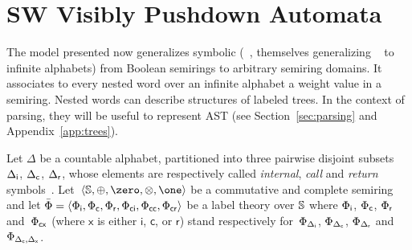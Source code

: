








\section{SW Visibly Pushdown Automata}
\label{section:SWVPA}\label{sec:SWVPA}
The model presented now generalizes symbolic \VPA
(\SVPA~\cite{dAntonyAlur14SVPDA},
 themselves generalizing \VPA~\cite{AlurMadhusudan09nested} to infinite alphabets)
from Boolean semirings to arbitrary semiring domains.
It associates to every nested word over an infinite alphabet a weight value
in a semiring.
Nested words can describe structures of labeled trees.
In the context of parsing, they will be useful to
represent AST %
(see Section~\ref{sec:parsing} and Appendix~\ref{app:trees}). %

\noindent
\label{sec:SWVPA-def}
Let $\Delta$ be a countable alphabet,
partitioned into three
pairwise disjoint subsets~${\Delta_\mathsf{i}}$, ${\Delta_\mathsf{c}}$, ${\Delta_\mathsf{r}}$,
whose elements are respectively called
\emph{internal}, \emph{call} and \emph{return} symbols~\cite{AlurMadhusudan09nested}.
Let~$\< \Semiring, \oplus, \zero, \otimes, \one>$ be a commutative and complete semiring and let
$\bar\Phi = \< \Phii, \Phic, \Phir, \Phici, \Phicc, \Phicr>$
be a label theory over $\mathbb{S}$
where ${\Phi_\mathsf{i}}$, ${\Phi_\mathsf{c}}$, ${\Phi_\mathsf{r}}$ and~${\Phi_\mathsf{cx}}$ 
(where $\mathsf{x}$ is either $\mathsf{i}$, $\mathsf{c}$, or $\mathsf{r}$)
stand respectively
for~$\Phi_{\Delta_\mathsf{i}}$, $\Phi_{\Delta_\mathsf{c}}$, $\Phi_{\Delta_\mathsf{r}}$ and~$\Phi_{{\Delta_\mathsf{c}}, \Delta_\mathsf{x}}$.
%

